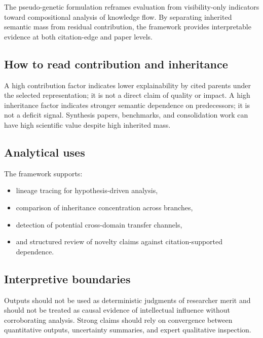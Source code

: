 The pseudo-genetic formulation reframes evaluation from visibility-only indicators toward compositional analysis of knowledge flow. By separating inherited semantic mass from residual contribution, the framework provides interpretable evidence at both citation-edge and paper levels.

\subsection{How to read contribution and inheritance}
A high contribution factor indicates lower explainability by cited parents under the selected representation; it is not a direct claim of quality or impact. A high inheritance factor indicates stronger semantic dependence on predecessors; it is not a deficit signal. Synthesis papers, benchmarks, and consolidation work can have high scientific value despite high inherited mass.

\subsection{Analytical uses}
The framework supports:
\begin{itemize}
    \item lineage tracing for hypothesis-driven analysis,
    \item comparison of inheritance concentration across branches,
    \item detection of potential cross-domain transfer channels,
    \item and structured review of novelty claims against citation-supported dependence.
\end{itemize}

\subsection{Interpretive boundaries}
Outputs should not be used as deterministic judgments of researcher merit and should not be treated as causal evidence of intellectual influence without corroborating analysis. Strong claims should rely on convergence between quantitative outputs, uncertainty summaries, and expert qualitative inspection.
